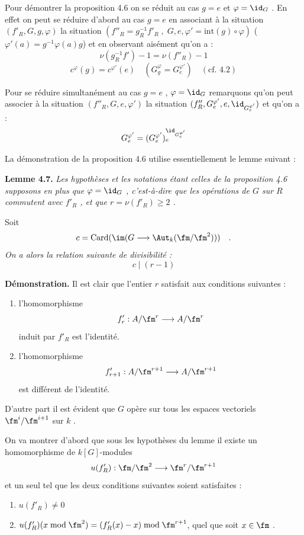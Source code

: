 \medskip

Pour démontrer la proposition 4.6 on se réduit au cas $g = e$ et $\varphi = \id_G$ . En effet on peut se réduire d'abord au cas $g = e$ en associant à la situation $(f'_R, G, g, \varphi)$ la situation $(f''_R = g_R^{-1}f'_R \; , \; G, e, \varphi' = \mathrm{int}(g) \circ \varphi)$ ($\varphi'(a) = g^{-1}\varphi(a)g$) et en observant aisément qu'on a :
\[
\nu(g_R^{-1}f') - 1 = \nu(f''_R) - 1
\]
\[
c^\varphi(g) = c^{\varphi'}(e) \quad (G_g^\varphi = G_e^{\varphi'}) \quad (\text{cf. 4.2})
\]

Pour se réduire simultanément au cas $g = e$ , $\varphi = \id_G$ remarquons qu'on peut associer à la situation $(f''_R, G, e, \varphi')$ la situation $(f''_R, G_e^{\varphi'}, e, \id_{G_e^{\varphi'}})$ et qu'on a :
\[
G_e^{\varphi'} = (G_e^{\varphi'})_e^{\id_{G_e^{\varphi'}}}
\]

La démonstration de la proposition 4.6 utilise essentiellement le lemme suivant :

\medskip
\noindent
\textbf{Lemme 4.7.} \emph{Les hypothèses et les notations étant celles de la proposition 4.6 supposons en plus que $\varphi = \id_G$ , c'est-à-dire que les opérations de $G$ sur $R$ commutent avec $f'_R$ , et que $r = \nu(f'_R) \geq 2$ .}

Soit
\emph{\[
c = \operatorname{Card}(\im(G \longrightarrow \Aut_k(\fm/\fm^2))) \quad .
\]
On a alors la relation suivante de divisibilité :
\[
c \mid (r - 1)
\]}

\medskip

\noindent
\textbf{Démonstration.} Il est clair que l'entier $r$ satisfait aux conditions suivantes :
\begin{enumerate}
\item[a)] l'homomorphisme
\[
f'_r : A/\fm^r \longrightarrow A/\fm^r
\]
induit par $f'_R$ est l'identité.
\item[b)] l'homomorphisme
\[
f'_{r+1} : A/\fm^{r+1} \longrightarrow A/\fm^{r+1}
\]
est différent de l'identité.
\end{enumerate}

D'autre part il est évident que $G$ opère sur tous les espaces vectoriels $\fm^i/\fm^{i+1}$ sur $k$ .

On va montrer d'abord que sous les hypothèses du lemme il existe un homomorphisme de $k[G]$-modules
\[
u(f'_R) : \fm/\fm^2 \longrightarrow \fm^r/\fm^{r+1}
\]
et un seul tel que les deux conditions suivantes soient satisfaites :
\begin{enumerate}
\item[1)] $u(f'_R) \neq 0$
\item[2)] $u(f'_R)(x \bmod \fm^2) = (f'_R(x) - x) \bmod \fm^{r+1}$, quel que soit $x \in \fm$ .
\end{enumerate}

